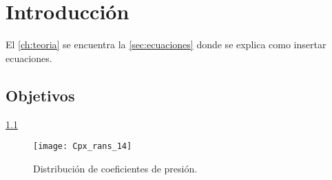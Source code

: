 \chapter{Introducción}\label{ch:intro}

\lipsum[1-9]
El \cref{ch:teoria} se encuentra la \cref{sec:ecuaciones} donde se explica como insertar ecuaciones.

\section*{Objetivos}

\lipsum[1]
\cref{fig:img1}

\begin{figure}[ht!]
  \centering
    \texttt{[image: Cpx\_rans\_14]}    
    \caption{Distribución de coeficientes de presión.}         
  \label{fig:img1}                          
\end{figure}
